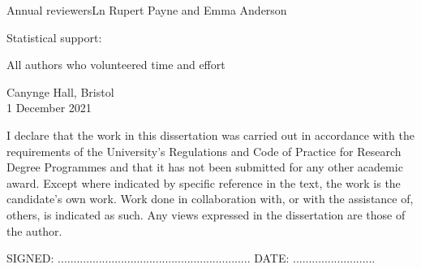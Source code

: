 \documentclass[a4paper, twoside]{templates/ociamthesis}
\begin{document}
\begin{romanpages}
\begin{acknowledgements}
  Annual reviewersLn Rupert Payne and Emma Anderson

  Statistical support:

  All authors who volunteered time and effort

  \begin{flushright}
  Canynge Hall, Bristol \\
  1 December 2021
  \end{flushright}
\end{acknowledgements}

\begin{declaration}
 	I declare that the work in this dissertation was carried out in accordance with the requirements of the University's Regulations and Code of Practice for Research Degree Programmes and that it has not been submitted for any other academic award. Except where indicated by specific reference in the text, the work is the candidate's own work. Work done in collaboration with, or with the assistance of, others, is indicated as such. Any views expressed in the dissertation are those of the author.

  \begin{flushright}
  SIGNED: .............................................................         DATE: ..........................\\
  \end{flushright}
\end{declaration}

  \dominitoc %

\flushbottom

\tableofcontents

\listoffigures
	\mtcaddchapter

\listoftables
  \mtcaddchapter


\end{romanpages}
\end{document}

